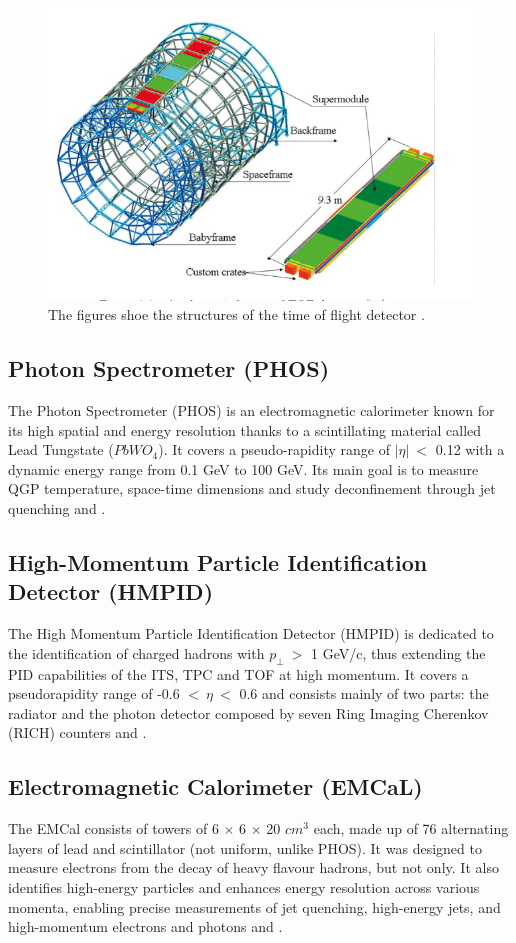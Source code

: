 \documentclass[12pt,a4paper]{book}
\begin{document}
	\begin{figure}
		\centering
		\includegraphics[width=0.5\linewidth]{pictures/TOF.png}
		\caption{The figures shoe the structures of the time of flight detector \cite{ALICE:2014sbxFs}.}
		\label{fig:TOF}
	\end{figure}
	\FloatBarrier
	
	\subsection{Photon Spectrometer (PHOS)}
	The Photon Spectrometer (PHOS) is an electromagnetic calorimeter known for its  high spatial and energy resolution thanks to a scintillating material called Lead Tungstate ($PbWO_4$). It covers a pseudo-rapidity range of $ |\eta|\ <$ 0.12 with a dynamic energy range from 0.1 GeV to 100 GeV. Its main goal is to measure QGP temperature, space-time dimensions and study deconfinement through jet quenching \cite{Padhan:2924203} and \cite{amsdottorato9036}.
	
	\subsection{High-Momentum Particle Identification Detector (HMPID)}
	The High Momentum Particle Identification Detector (HMPID) is dedicated to the identification of charged hadrons with $p_\perp \ >$ 1 GeV/c, thus extending the PID capabilities of the ITS, TPC and TOF at high momentum. It covers a pseudorapidity range of -0.6 $< \ \eta \ < $ 0.6 and consists mainly of two parts: the radiator and the photon detector composed by seven Ring Imaging Cherenkov (RICH) counters \cite{Padhan:2924203} and \cite{amsdottorato9036}.
	
	\subsection{Electromagnetic Calorimeter (EMCaL)}
	The EMCal consists of towers of 6 × 6 × 20 $cm^3$ each, made up of 76 alternating layers of lead and scintillator (not uniform, unlike PHOS). It was designed to measure electrons from the decay of heavy flavour hadrons, but not only. It also identifies high-energy particles and enhances energy resolution across various momenta, enabling precise measurements of jet quenching, high-energy jets, and high-momentum electrons and photons \cite{Padhan:2924203} and \cite{Arata:2922803}.
	
\end{document}
